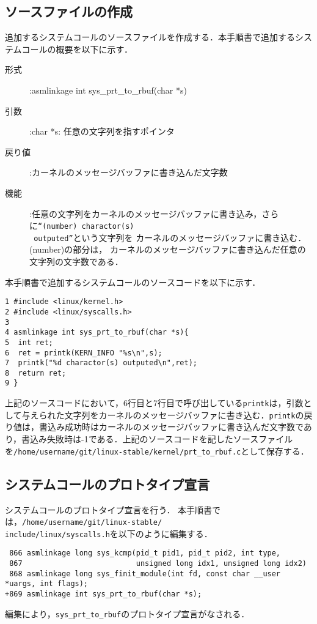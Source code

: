 \documentclass[12pt]{jsarticle}
\begin{document}
\subsection{ソースファイルの作成}
追加するシステムコールのソースファイルを作成する．本手順書で追加するシステムコールの概要を以下に示す．
\begin{description}
  \item[形式] :asmlinkage int sys\_prt\_to\_rbuf(char *s)
  \item[引数] :char *s: 任意の文字列を指すポインタ
  \item[戻り値] :カーネルのメッセージバッファに書き込んだ文字数
  \item[機能] :任意の文字列をカーネルのメッセージバッファに書き込み，さらに\verb|“(number) charactor(s)|\\
    \verb| outputed”|という文字列を
      カーネルのメッセージバッファに書き込む．(number)の部分は，
      カーネルのメッセージバッファに書き込んだ任意の文字列の文字数である．
\end{description}
本手順書で追加するシステムコールのソースコードを以下に示す．

\begin{verbatim}
1 #include <linux/kernel.h>
2 #include <linux/syscalls.h>
3
4 asmlinkage int sys_prt_to_rbuf(char *s){
5  int ret;
6  ret = printk(KERN_INFO "%s\n",s);
7  printk("%d charactor(s) outputed\n",ret);
8  return ret;
9 }
\end{verbatim}
上記のソースコードにおいて，6行目と7行目で呼び出している\verb|printk|は，引数として与えられた文字列をカーネルのメッセージバッファに書き込む．\verb|printk|の戻り値は，書込み成功時はカーネルのメッセージバッファに書き込んだ文字数であり，書込み失敗時は-1である．上記のソースコードを記したソースファイルを\verb|/home/username/git/linux-stable/kernel/prt_to_rbuf.c|として保存する．
\subsection{システムコールのプロトタイプ宣言}
システムコールのプロトタイプ宣言を行う．
本手順書では，\verb|/home/username/git/linux-stable/|\\
\verb|include/linux/syscalls.h|を以下のように編集する．
\begin{verbatim}
 866 asmlinkage long sys_kcmp(pid_t pid1, pid_t pid2, int type,
 867                          unsigned long idx1, unsigned long idx2)
 868 asmlinkage long sys_finit_module(int fd, const char __user *uargs, int flags);
+869 asmlinkage int sys_prt_to_rbuf(char *s);
\end{verbatim}
編集により，\verb|sys_prt_to_rbuf|のプロトタイプ宣言がなされる．
\end{document}
